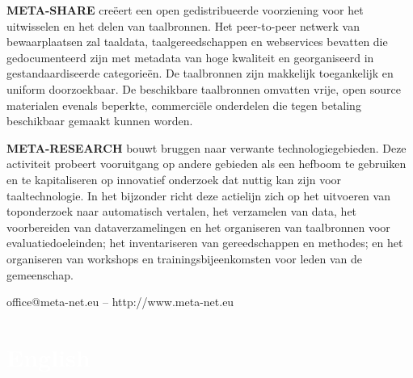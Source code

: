 \begin{multicols}{2}
    \textbf{META-SHARE} cre{\"e}ert een open gedistribueerde voorziening voor het uitwisselen en het delen van taalbronnen. Het peer-to-peer netwerk van bewaarplaatsen zal taaldata, taalgereedschappen en webservices bevatten die gedocumenteerd zijn met metadata van hoge kwaliteit en georganiseerd in gestandaardiseerde categorie{\"e}n. De taalbronnen zijn makkelijk toegankelijk en uniform doorzoekbaar. De beschikbare taalbronnen omvatten vrije, open source materialen evenals beperkte, commerci{\"e}le onderdelen die tegen betaling beschikbaar gemaakt kunnen worden.

    \textbf{META-RESEARCH} bouwt bruggen naar verwante technologiegebieden. Deze activiteit probeert vooruitgang op andere gebieden als een hefboom te gebruiken en te kapitaliseren op innovatief onderzoek dat nuttig kan zijn voor taaltechnologie. In het bijzonder richt deze actielijn zich op het uitvoeren van  toponderzoek naar automatisch vertalen, het verzamelen van  data, het voorbereiden van dataverzamelingen en het organiseren van taalbronnen voor evaluatiedoeleinden; het inventariseren van gereedschappen en methodes; en het organiseren van workshops en trainingsbijeenkomsten voor leden van de gemeenschap.

\centerline{office@meta-net.eu -- http://www.meta-net.eu}
\end{multicols}


\makeatletter
{}
{
  \renewcommand*{\theHsection}{\thepart.\thesection}
}
\makeatother
\part*{\textcolor{white}{English}}
\setcounter{section}{0}
\setcounter{figure}{0}


\cleardoublepage




